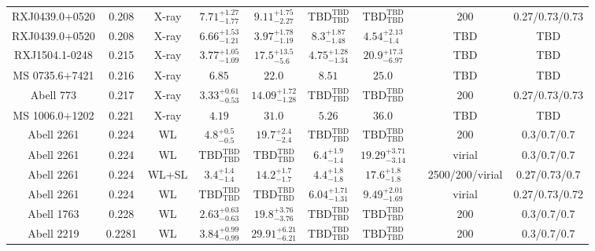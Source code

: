 \begin{table}
\begin{tabular}{cccccccccc}
RXJ0439.0+0520 & 0.208 & X-ray & ${7.71}^{+1.27}_{-1.77}$ & ${9.11}^{+1.75}_{-2.27}$ & ${\mathrm{TBD}}^{\mathrm{TBD}}_{\mathrm{TBD}}$ & ${\mathrm{TBD}}^{\mathrm{TBD}}_{\mathrm{TBD}}$ & \citet{BA14.1} & 200 & 0.27/0.73/0.73 \\
RXJ0439.0+0520 & 0.208 & X-ray & ${6.66}^{+1.53}_{-1.21}$ & ${3.97}^{+1.78}_{-1.19}$ & ${8.3}^{+1.87}_{-1.48}$ & ${4.54}^{+2.13}_{-1.4}$ & \citet{SC06.1} & TBD & TBD \\
RXJ1504.1-0248 & 0.215 & X-ray & ${3.77}^{+1.05}_{-1.09}$ & ${17.5}^{+13.5}_{-5.6}$ & ${4.75}^{+1.28}_{-1.34}$ & ${20.9}^{+17.3}_{-6.97}$ & \citet{SC06.1} & TBD & TBD \\
MS 0735.6+7421 & 0.216 & X-ray & ${6.85}^{}_{}$ & ${22.0}^{}_{}$ & ${8.51}^{}_{}$ & ${25.0}^{}_{}$ & \citet{MO99.1} & TBD & TBD \\
Abell 773 & 0.217 & X-ray & ${3.33}^{+0.61}_{-0.53}$ & ${14.09}^{+1.72}_{-1.28}$ & ${\mathrm{TBD}}^{\mathrm{TBD}}_{\mathrm{TBD}}$ & ${\mathrm{TBD}}^{\mathrm{TBD}}_{\mathrm{TBD}}$ & \citet{BA14.1} & 200 & 0.27/0.73/0.73 \\
MS 1006.0+1202 & 0.221 & X-ray & ${4.19}^{}_{}$ & ${31.0}^{}_{}$ & ${5.26}^{}_{}$ & ${36.0}^{}_{}$ & \citet{MO99.1} & TBD & TBD \\
Abell 2261 & 0.224 & WL & ${4.8}^{+0.5}_{-0.5}$ & ${19.7}^{+2.4}_{-2.4}$ & ${\mathrm{TBD}}^{\mathrm{TBD}}_{\mathrm{TBD}}$ & ${\mathrm{TBD}}^{\mathrm{TBD}}_{\mathrm{TBD}}$ & \citet{SE14.1} & 200 & 0.3/0.7/0.7 \\
Abell 2261 & 0.224 & WL & ${\mathrm{TBD}}^{\mathrm{TBD}}_{\mathrm{TBD}}$ & ${\mathrm{TBD}}^{\mathrm{TBD}}_{\mathrm{TBD}}$ & ${6.4}^{+1.9}_{-1.4}$ & ${19.29}^{+3.71}_{-3.14}$ & \citet{UM09.1} & virial & 0.3/0.7/0.7 \\
Abell 2261 & 0.224 & WL+SL & ${3.4}^{+1.4}_{-1.4}$ & ${14.2}^{+1.7}_{-1.7}$ & ${4.4}^{+1.8}_{-1.8}$ & ${17.6}^{+1.8}_{-1.8}$ & \citet{ME14.1} & 2500/200/virial & 0.27/0.73/0.7 \\
Abell 2261 & 0.224 & WL & ${\mathrm{TBD}}^{\mathrm{TBD}}_{\mathrm{TBD}}$ & ${\mathrm{TBD}}^{\mathrm{TBD}}_{\mathrm{TBD}}$ & ${6.04}^{+1.71}_{-1.31}$ & ${9.49}^{+2.01}_{-1.69}$ & \citet{OK10.1} & virial & 0.27/0.73/0.72 \\
Abell 1763 & 0.228 & WL & ${2.63}^{+0.63}_{-0.63}$ & ${19.8}^{+3.76}_{-3.76}$ & ${\mathrm{TBD}}^{\mathrm{TBD}}_{\mathrm{TBD}}$ & ${\mathrm{TBD}}^{\mathrm{TBD}}_{\mathrm{TBD}}$ & \citet{BA07.1} & 200 & 0.3/0.7/0.7 \\
Abell 2219 & 0.2281 & WL & ${3.84}^{+0.99}_{-0.99}$ & ${29.91}^{+6.21}_{-6.21}$ & ${\mathrm{TBD}}^{\mathrm{TBD}}_{\mathrm{TBD}}$ & ${\mathrm{TBD}}^{\mathrm{TBD}}_{\mathrm{TBD}}$ & \citet{BA07.1} & 200 & 0.3/0.7/0.7 \\

\end{tabular}
\end{table}

